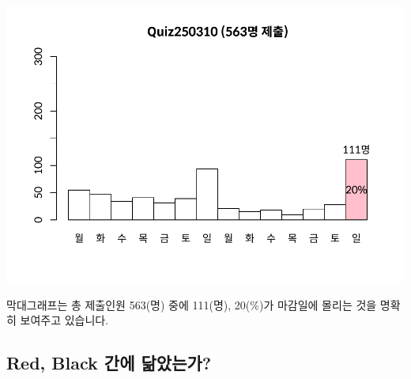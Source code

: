 \documentclass[
]{book}
\begin{document}
\includegraphics{Quiz_report_2025_files/figure-latex/unnamed-chunk-40-1.pdf}

막대그래프는 총 제출인원 563(명) 중에 111(명), 20(\%)가 마감일에 몰리는 것을 명확히 보여주고 있습니다.

\subsection{Red, Black 간에 닮았는가?}\label{red-black-uxac04uxc5d0-uxb2eeuxc558uxb294uxac00-1}
\end{document}
